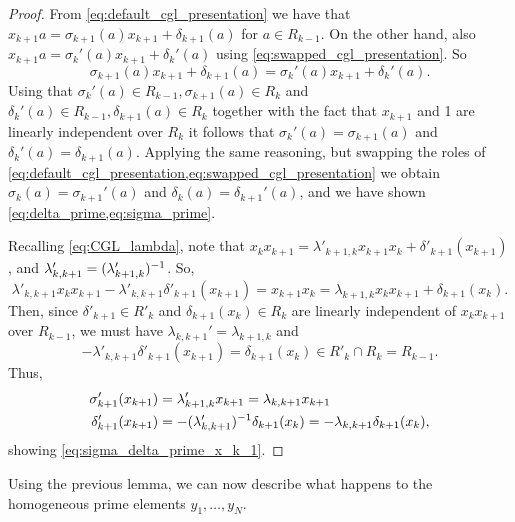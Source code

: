 \begin{proof}
	From \cref{eq:default_cgl_presentation} we have that $x_{k+1}a = \sigma_{k+1}(a)x_{k+1}
		+ \delta_{k+1}(a)$ for $a \in R_{k-1}$. On the other hand, also $x_{k+1}a =
		\sigma_k'(a)x_{k+1} + \delta_k'(a)$ using \cref{eq:swapped_cgl_presentation}. So
	\begin{equation*}
		\sigma_{k+1}(a)x_{k+1} + \delta_{k+1}(a) = \sigma_k'(a) x_{k+1} + \delta_k'(a).
	\end{equation*}
	Using that $\sigma_k'(a)\in R_{k-1}, \sigma_{k+1}(a) \in R_k$ and $\delta_k'(a) \in
		R_{k-1}, \delta_{k+1}(a) \in R_{k}$ together with the fact that $x_{k+1}$ and 1 are
	linearly independent over $R_k$ it follows that $\sigma_k'(a) = \sigma_{k+1}(a)$ and
	$\delta_k'(a) = \delta_{k+1}(a)$. Applying the same reasoning, but swapping the roles
	of \cref{eq:default_cgl_presentation,eq:swapped_cgl_presentation} we obtain
	$\sigma_k(a) = \sigma_{k+1}'(a)$ and $\delta_k(a) = \delta_{k+1}'(a)$, and we have
	shown \cref{eq:delta_prime,eq:sigma_prime}.

	Recalling \cref{eq:CGL_lambda}, note that $x_k x_{k+1} = \lambda'_{k+1,k}x_{k+1}x_{k} +
		\delta'_{k+1}(x_{k+1})$, and $\lambda'_{k,k+1} = (\lambda_{k+1, k}')^{-1}$. So,
	\begin{equation*}
		\lambda'_{k,k+1}x_k x_{k+1} - \lambda'_{k,k+1} \delta'_{k+1}(x_{k+1}) = x_{k+1} x_k = \lambda_{k+1, k} x_k x_{k+1} + \delta_{k+1}(x_k).
	\end{equation*}
	Then, since $\delta'_{k+1} \in R'_k $ and $\delta_{k+1}(x_k) \in R_k$ are linearly
	independent of $x_k x_{k+1}$ over $R_{k-1}$, we must have $\lambda_{k,k+1}' =
		\lambda_{k+1,k}$ and
	\begin{equation*}
		-\lambda'_{k,k+1}\delta'_{k+1}(x_{k+1}) = \delta_{k+1}(x_k) \in R'_k \cap R_k = R_{k-1}.
	\end{equation*}
	Thus,
	\begin{align*}
		\sigma'_{k+1}(x_{k+1}) & = \lambda'_{k+1,k}x_{k+1} = \lambda_{k, k+1}x_{k+1}         \\
		\delta'_{k+1}(x_{k+1}) & = -(\lambda_{k,k+1}')^{-1} \delta_{k+1}(x_k) = - \lambda_{k,
			k+1}\delta_{k+1}(x_k),
	\end{align*}
	showing \cref{eq:sigma_delta_prime_x_k_1}.
\end{proof}

Using the previous lemma, we can now describe what happens to the homogeneous prime
elements $y_1, \dots, y_N$.

